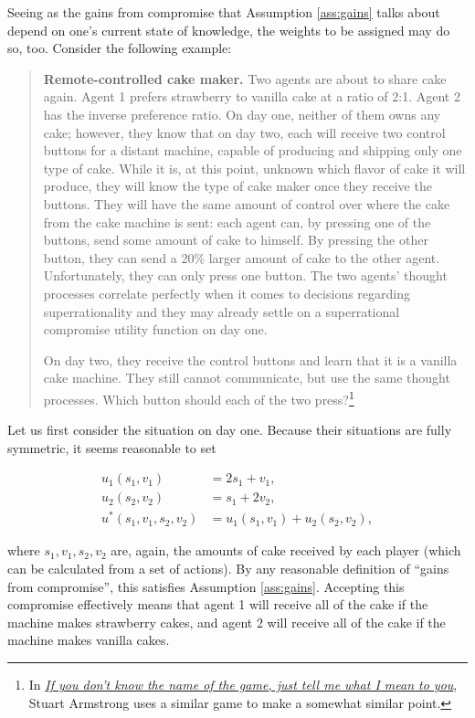 Seeing as the gains from compromise that Assumption \ref{ass:gains} talks about depend
on one's current state of knowledge, the weights to be assigned may do
so, too. Consider the following example:

\begin{quote}
\textbf{Remote-controlled cake maker.} Two agents are about to share
cake again. Agent 1 prefers strawberry to vanilla cake at a ratio of
2:1. Agent 2 has the inverse preference ratio. On day one, neither of
them owns any cake; however, they know that on day two, each will
receive two control buttons for a distant machine, capable of producing
and shipping only one type of cake. While it is, at this point, unknown
which flavor of cake it will produce, they will know the type of cake
maker once they receive the buttons. They will have the same amount of
control over where the cake from the cake machine is sent: each agent
can, by pressing one of the buttons, send some amount of cake to
himself. By pressing the other button, they can send a 20\% larger
amount of cake to the other agent. Unfortunately, they can only press
one button. The two agents' thought processes correlate perfectly when
it comes to decisions regarding superrationality and they may already
settle on a superrational compromise utility function on day one.

On day two, they receive the control buttons and learn that it is a
vanilla cake machine. They still cannot communicate, but use the same
thought processes. Which button should each of the two press?\footnote{In
  \href{http://lesswrong.com/lw/2xb/if_you_dont_know_the_name_of_the_game_just_tell/}{\emph{If
  you don't know the name of the game, just tell me what I mean to
  you}}, Stuart Armstrong uses a similar game to make a somewhat
  similar point.}
\end{quote}

Let us first consider the situation on day one. Because their situations
are fully symmetric, it seems reasonable to set

\begin{align*}
u_{1}(s_{1},v_{1}) &= 2s_{1} + v_{1},\\
u_{2}(s_{2},v_{2}) &= s_{1} + {2v}_{2},\\
u^{*}(s_{1},v_{1},s_{2},v_{2}) &= u_{1}(s_{1},v_{1}) + u_{2}(s_{2},v_{2}),
\end{align*}

where \(s_{1},v_{1},s_{2},v_{2}\) are, again, the amounts of cake
received by each player (which can be calculated from a set of actions).
By any reasonable definition of ``gains from compromise'', this
satisfies Assumption \ref{ass:gains}. Accepting this compromise effectively means that
agent 1 will receive all of the cake if the machine makes strawberry
cakes, and agent 2 will receive all of the cake if the machine makes
vanilla cakes.

